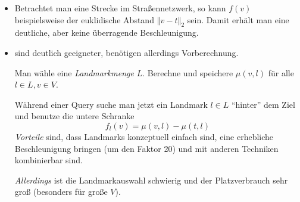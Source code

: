 \begin{itemize}
  \item Betrachtet man eine Strecke im Straßennetzwerk, so kann \( f(v) \) beispielsweise der euklidische Abstand \( \left\Vert v - t \right\Vert_2 \) sein. Damit erhält man eine deutliche, aber keine überragende Beschleunigung.
  \item {} sind deutlich geeigneter, benötigen allerdings Vorberechnung.

  Man wähle eine \emph{Landmarkmenge} \( L \). Berechne und speichere \( \mu(v,l) \) für alle \( l \in L, v \in V \).

  Während einer Query suche man jetzt ein Landmark \( l \in L \) ``hinter'' dem Ziel und benutze die untere Schranke
  \begin{equation*}
    f_l(v) = \mu(v,l) - \mu(t,l)
  \end{equation*}
  \emph{Vorteile} sind, dass Landmarks konzeptuell einfach sind, eine erhebliche Beschleunigung bringen (um den Faktor 20) und mit anderen Techniken kombinierbar sind.

  \emph{Allerdings} ist die Landmarkauswahl schwierig und der Platzverbrauch sehr groß (besonders für große \( V \)).
\end{itemize}